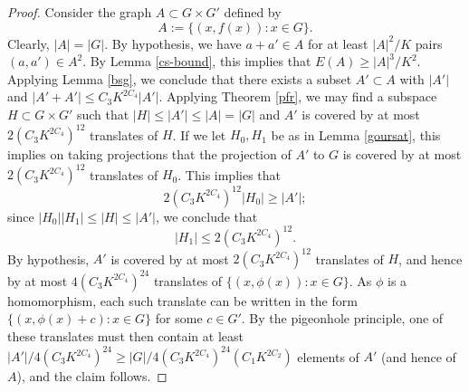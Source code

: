 \begin{proof} Consider the graph $A \subset G \times G'$ defined by
$$ A := \{ (x,f(x)): x \in G \}.$$
Clearly, $|A| = |G|$.  By hypothesis, we have $a+a' \in A$ for at least $|A|^2/K$ pairs $(a,a') \in A^2$.  By Lemma \ref{cs-bound}, this implies that $E(A) \geq |A|^3/K^2$.  Applying Lemma \ref{bsg}, we conclude that there exists a subset $A' \subset A$ with $|A'|$ and $|A'+A'| \leq C_3 K^{2C_4} |A'|$.  Applying Theorem \ref{pfr}, we may find a subspace $H \subset G \times G'$ such that $|H| \leq |A'| \leq |A| = |G|$ and $A'$ is covered by at most $2 (C_3 K^{2C_4})^{12}$ translates of $H$.  If we let $H_0,H_1$ be as in Lemma \ref{goursat}, this implies on taking projections that the projection of $A'$ to $G$ is covered by at most $2 (C_3 K^{2C_4})^{12}$ translates of $H_0$.  This implies that
$$ 2 (C_3 K^{2C_4})^{12} |H_0| \geq |A'|;$$
since $|H_0| |H_1| \leq |H| \leq |A'|$, we conclude that
$$ |H_1| \leq 2(C_3 K^{2C_4})^{12}.$$
By hypothesis, $A'$ is covered by at most $2(C_3 K^{2C_4})^{12}$ translates of $H$, and hence by at most $4(C_3 K^{2C_4})^{24}$ translates of $\{ (x,\phi(x)): x \in G \}$.  As $\phi$ is a homomorphism, each such translate can be written in the form $\{ (x,\phi(x)+c): x \in G \}$ for some $c \in G'$.  By the pigeonhole principle, one of these translates must then contain at least
$|A'|/4(C_3 K^{2C_4})^{24} \geq |G| / 4 (C_3 K^{2C_4})^{24} (C_1 K^{2C_2})$ elements of $A'$ (and hence of $A$), and the claim follows.
\end{proof}
